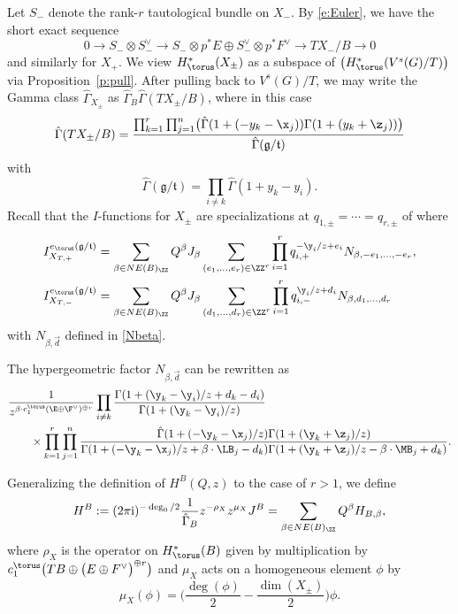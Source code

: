 Let $S_-$ denote the rank-$r$ tautological bundle on $X_-$. By \eqref{e:Euler}, we have the short exact sequence
\[0 \to S_- \otimes S_-^\vee \to S_- \otimes p^*E \oplus S_-^\vee \otimes p^*F^\vee \to TX_-/B \to 0
\]
and similarly for $X_+$. We view $H^*_\torus(X_\pm)$ as a subspace of $\bigl(H^*_\torus( V^{s}(G)/T)\bigr)$ via Proposition~\ref{p:pull}. After pulling back to $V^s(G)/T$, we may
 write the Gamma class $\hat \Gamma_{X_\pm}$ as
$\hat \Gamma_{B} \hat \Gamma(TX_\pm/B)$, where in this case
\[
\hat \Gamma(TX_\pm/B) = \frac{\prod_{k=1}^r\prod_{j=1}^n\bigl(
\hat \Gamma(1+(- y_k-\x_j))\Gamma(1+(y_k+\z_j))\bigr)}{\hat \Gamma(\mathfrak g/\mathfrak t)}
\]
with
\[
\hat \Gamma(\mathfrak g/\mathfrak t) = \prod_{i \neq k} \hat \Gamma(1 + y_k - y_i).
\]
Recall that the $I$-functions for $X_\pm$ are specializations at $q_{1, \pm} = \cdots = q_{r, \pm}$ of  where
\begin{align*}
&I_{X_{T, +}}^{e_\torus(\mathfrak g /\mathfrak t)}=
\sum_{\beta \in NE(B)_\ZZ} Q^\beta J_\beta \sum_{(e_1, \dots, e_r) \in \ZZ^r} \prod_{i=1}^r q_{i, +}^{-\y_i/z+e_i}N_{\beta, -e_1, \dots , -e_r} ,\\
 &I_{X_{T, -}}^{e_\torus(\mathfrak g /\mathfrak t)}=
\sum_{\beta \in NE(B)_\ZZ} Q^\beta J_\beta \sum_{(d_1, \dots, d_r) \in \ZZ^r} \prod_{i=1}^r q_{i, -}^{\y_i/z+d_i}N_{\beta, d_1, \dots , d_r}
\end{align*}
with $N_{\beta,\vec{d}}$ defined in \eqref{Nbeta}.

The hypergeometric factor $N_{\beta,\vec{d}}$ can be rewritten as \begin{align*}
 &\frac{1}{z^{\beta \cdot c_1^\torus(\E \oplus \F^\vee)^{\oplus r}}}\prod_{ i\neq k}\frac{ \Gamma(1 + (\y_k - \y_i)/z + d_k - d_i) }{ \Gamma(1 + (\y_k - \y_i)/z)} \\
 &\qquad{}\times\prod_{k=1}^r\prod_{j=1}^n \frac{
\hat \Gamma(1+(- \y_k-\x_j)/z)\Gamma(1+(\y_k+\z_j)/z)}{\Gamma(1+(-\y_k-\x_j)/z+\beta\cdot \LB_j - d_k)\Gamma(1+(\y_k+\z_j)/z-\beta\cdot \MB_j + d_k)}.
\end{align*}

Generalizing the definition of $H^B(Q ,z)$ to the case of $r>1$, we define
\begin{align*} H^B := (2 \pi {\rm i})^{-\deg_0/2}\frac{1}{\hat \Gamma_B} z^{- \rho_{X}} z^{\mu_{X}} J^B
 =
\sum_{\beta \in NE(B)_\ZZ} Q^\beta H_{B, \beta},\end{align*}
where $\rho_{X}$ is the operator on $H^*_\torus(B)$ given by multiplication by $c_1^\torus\bigl(TB \oplus \bigl(E \oplus F^\vee\bigr)^{\oplus r}\bigr)$ and $\mu_X$ acts on a homogeneous element $\phi$ by
\[
\mu_{X}(\phi) = \biggl( \frac{\deg(\phi)}{2} -\frac{ \dim(X_{\pm})}{2} \biggr) \phi.
\]

